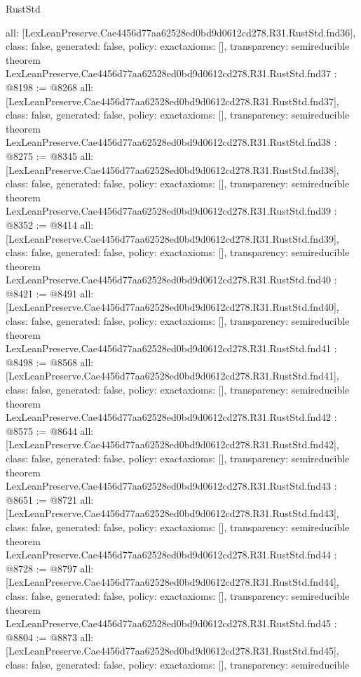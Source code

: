\begin{lexlean}{RustStd}
\begin{coremodule}
{  all: [LexLeanPreserve.Cae4456d77aa62528ed0bd9d0612cd278.R31.RustStd.fnd36],
  class: false,
  generated: false,
  policy: exact{axioms: []},
  transparency: semireducible
}
theorem LexLeanPreserve.Cae4456d77aa62528ed0bd9d0612cd278.R31.RustStd.fnd37 : @8198 := @8268 {
  all: [LexLeanPreserve.Cae4456d77aa62528ed0bd9d0612cd278.R31.RustStd.fnd37],
  class: false,
  generated: false,
  policy: exact{axioms: []},
  transparency: semireducible
}
theorem LexLeanPreserve.Cae4456d77aa62528ed0bd9d0612cd278.R31.RustStd.fnd38 : @8275 := @8345 {
  all: [LexLeanPreserve.Cae4456d77aa62528ed0bd9d0612cd278.R31.RustStd.fnd38],
  class: false,
  generated: false,
  policy: exact{axioms: []},
  transparency: semireducible
}
theorem LexLeanPreserve.Cae4456d77aa62528ed0bd9d0612cd278.R31.RustStd.fnd39 : @8352 := @8414 {
  all: [LexLeanPreserve.Cae4456d77aa62528ed0bd9d0612cd278.R31.RustStd.fnd39],
  class: false,
  generated: false,
  policy: exact{axioms: []},
  transparency: semireducible
}
theorem LexLeanPreserve.Cae4456d77aa62528ed0bd9d0612cd278.R31.RustStd.fnd40 : @8421 := @8491 {
  all: [LexLeanPreserve.Cae4456d77aa62528ed0bd9d0612cd278.R31.RustStd.fnd40],
  class: false,
  generated: false,
  policy: exact{axioms: []},
  transparency: semireducible
}
theorem LexLeanPreserve.Cae4456d77aa62528ed0bd9d0612cd278.R31.RustStd.fnd41 : @8498 := @8568 {
  all: [LexLeanPreserve.Cae4456d77aa62528ed0bd9d0612cd278.R31.RustStd.fnd41],
  class: false,
  generated: false,
  policy: exact{axioms: []},
  transparency: semireducible
}
theorem LexLeanPreserve.Cae4456d77aa62528ed0bd9d0612cd278.R31.RustStd.fnd42 : @8575 := @8644 {
  all: [LexLeanPreserve.Cae4456d77aa62528ed0bd9d0612cd278.R31.RustStd.fnd42],
  class: false,
  generated: false,
  policy: exact{axioms: []},
  transparency: semireducible
}
theorem LexLeanPreserve.Cae4456d77aa62528ed0bd9d0612cd278.R31.RustStd.fnd43 : @8651 := @8721 {
  all: [LexLeanPreserve.Cae4456d77aa62528ed0bd9d0612cd278.R31.RustStd.fnd43],
  class: false,
  generated: false,
  policy: exact{axioms: []},
  transparency: semireducible
}
theorem LexLeanPreserve.Cae4456d77aa62528ed0bd9d0612cd278.R31.RustStd.fnd44 : @8728 := @8797 {
  all: [LexLeanPreserve.Cae4456d77aa62528ed0bd9d0612cd278.R31.RustStd.fnd44],
  class: false,
  generated: false,
  policy: exact{axioms: []},
  transparency: semireducible
}
theorem LexLeanPreserve.Cae4456d77aa62528ed0bd9d0612cd278.R31.RustStd.fnd45 : @8804 := @8873 {
  all: [LexLeanPreserve.Cae4456d77aa62528ed0bd9d0612cd278.R31.RustStd.fnd45],
  class: false,
  generated: false,
  policy: exact{axioms: []},
  transparency: semireducible
}
\end{coremodule}
\end{lexlean}
